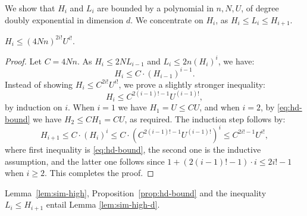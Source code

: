 \begin{appendixproof}
We show that $H_i$ and $L_i$ are bounded by a polynomial in $n, N, U$, of
degree doubly exponential in dimension $d$.
We concentrate on $H_i$, as
$H_i \leq L_i \leq H_{i+1}$.

\begin{proposition}\label{prop:hd-bound}
$H_i \leq (4Nn)^{2i!} U^{i!}$.
\end{proposition}

\begin{proof}%
Let $C = 4Nn$.
As $H_i \leq 2 N L_{i-1}$ and $L_i \leq 2n (H_i)^i$, we have:
\begin{equation}\label{eq:hd-bound}
H_i \leq C \cdot (H_{i-1})^{i-1}.
\end{equation}
Instead of showing  $H_i \leq C^{2i!} U^{i!}$, we
prove a slightly stronger inequality:
\[
H_i \leq C^{2(i-1)! - 1} U^{(i-1)!},
\]
by induction on $i$.
When $i = 1$ we have $H_1 = U \leq C U$, and when
$i = 2$, by \eqref{eq:hd-bound}
we have $H_2 \leq C H_1 = C U$, as required.
The induction step follows by:
\[
H_{i+1} \leq C \cdot (H_{i})^{i} \leq C \cdot (C^{2(i-1)! -1} U^{(i-1)!})^{i} \leq C^{2 i! - 1} U^{i!},
\]
where first inequality is \eqref{eq:hd-bound}, 
the second one is the inductive assumption, and the latter one follows
since $1 + (2(i-1)! -1)\cdot i \leq 2i! -1$ when $i\geq 2$.
This completes the proof.
\end{proof}
%
Lemma~\ref{lem:sim-high}, Proposition~\ref{prop:hd-bound} and the inequality $L_i \leq H_{i+1}$
entail Lemma \ref{lem:sim-high-d}.
\end{appendixproof}



